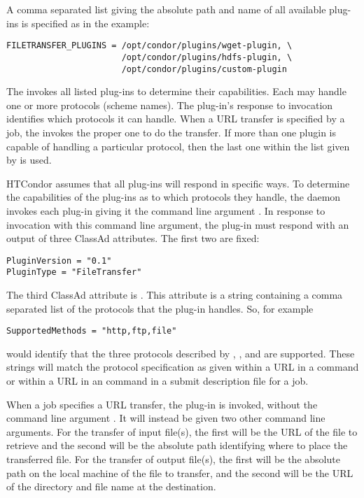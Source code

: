 A comma separated list giving the absolute path and name
of all available plug-ins is specified as in the example:
\footnotesize
\begin{verbatim}
FILETRANSFER_PLUGINS = /opt/condor/plugins/wget-plugin, \
                       /opt/condor/plugins/hdfs-plugin, \
                       /opt/condor/plugins/custom-plugin
\end{verbatim}
\normalsize

The  invokes all listed plug-ins to determine their 
capabilities. Each may handle one or more protocols (scheme names).
The plug-in's response to invocation identifies which protocols
it can handle.
When a URL transfer is specified by a job,
the  invokes the proper one to do the transfer.
If more than one plugin is capable of handling a particular protocol,
then the last one within the list given by 
is used.

HTCondor assumes that all plug-ins will respond in specific
ways.
To determine the capabilities of the plug-ins as to which protocols
they handle,
the \Condor{starter} daemon invokes each plug-in giving it the
command line argument .
In response to invocation with this command line argument,
the plug-in must respond with an output of three ClassAd attributes. 
The first two are fixed:
\footnotesize
\begin{verbatim}
PluginVersion = "0.1"
PluginType = "FileTransfer"
\end{verbatim}
\normalsize

The third ClassAd attribute is . 
This attribute is a string containing a comma separated list of the
protocols that the plug-in handles.
So, for example
\footnotesize
\begin{verbatim}
SupportedMethods = "http,ftp,file"
\end{verbatim}
\normalsize
would identify that the three protocols described by \verb@http@,
\verb@ftp@, and \verb@file@ are supported.
These strings will match the protocol specification as given
within a URL in a  command
or within a URL in an \SubmitCmd{output\_destination} command 
in a submit description file for a job.

When a job specifies a URL transfer,
the plug-in is invoked, without the command line argument .
It will instead be given two other command line arguments.
For the transfer of input file(s),
the first will be the URL of the file to retrieve
and the second will be the absolute path identifying where to place the
transferred file.
For the transfer of output file(s),
the first will be the absolute path on the local machine of the file
to transfer,
and the second will be the URL of the directory and file name
at the destination.

